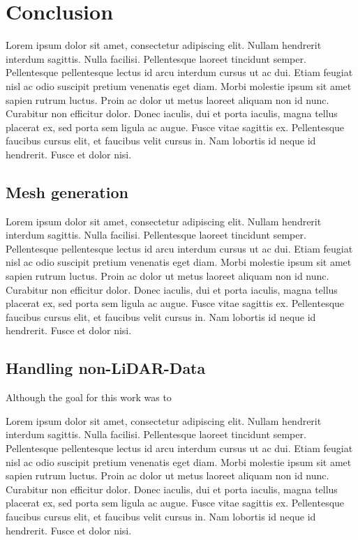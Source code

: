\section{Conclusion}


Lorem ipsum dolor sit amet, consectetur adipiscing elit. Nullam hendrerit interdum sagittis. Nulla facilisi. Pellentesque laoreet tincidunt semper. Pellentesque pellentesque lectus id arcu interdum cursus ut ac dui. Etiam feugiat nisl ac odio suscipit pretium venenatis eget diam. Morbi molestie ipsum sit amet sapien rutrum luctus. Proin ac dolor ut metus laoreet aliquam non id nunc. Curabitur non efficitur dolor. Donec iaculis, dui et porta iaculis, magna tellus placerat ex, sed porta sem ligula ac augue. Fusce vitae sagittis ex. Pellentesque faucibus cursus elit, et faucibus velit cursus in. Nam lobortis id neque id hendrerit. Fusce et dolor nisi.

\subsection{Mesh generation}

Lorem ipsum dolor sit amet, consectetur adipiscing elit. Nullam hendrerit interdum sagittis. Nulla facilisi. Pellentesque laoreet tincidunt semper. Pellentesque pellentesque lectus id arcu interdum cursus ut ac dui. Etiam feugiat nisl ac odio suscipit pretium venenatis eget diam. Morbi molestie ipsum sit amet sapien rutrum luctus. Proin ac dolor ut metus laoreet aliquam non id nunc. Curabitur non efficitur dolor. Donec iaculis, dui et porta iaculis, magna tellus placerat ex, sed porta sem ligula ac augue. Fusce vitae sagittis ex. Pellentesque faucibus cursus elit, et faucibus velit cursus in. Nam lobortis id neque id hendrerit. Fusce et dolor nisi.

\subsection{Handling non-LiDAR-Data}

Although the goal for this work was to 

Lorem ipsum dolor sit amet, consectetur adipiscing elit. Nullam hendrerit interdum sagittis. Nulla facilisi. Pellentesque laoreet tincidunt semper. Pellentesque pellentesque lectus id arcu interdum cursus ut ac dui. Etiam feugiat nisl ac odio suscipit pretium venenatis eget diam. Morbi molestie ipsum sit amet sapien rutrum luctus. Proin ac dolor ut metus laoreet aliquam non id nunc. Curabitur non efficitur dolor. Donec iaculis, dui et porta iaculis, magna tellus placerat ex, sed porta sem ligula ac augue. Fusce vitae sagittis ex. Pellentesque faucibus cursus elit, et faucibus velit cursus in. Nam lobortis id neque id hendrerit. Fusce et dolor nisi.


